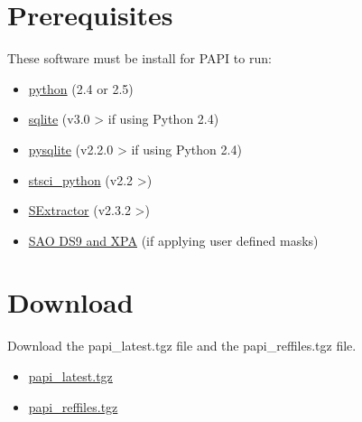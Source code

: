 \documentclass[letterpaper,10pt,english]{sphinxmanual}
\begin{document}

\section{Prerequisites}
\label{intro:prerequisites}\label{intro:index-0}
These software must be install for PAPI to run:
\begin{itemize}
\item {} 
\href{http://www.python.org}{python} (2.4 or 2.5)

\item {} 
\href{http://www.sqlite.org}{sqlite} (v3.0 \textgreater{} if using Python 2.4)

\item {} 
\href{http://initd.org/tracker/pysqlite}{pysqlite} (v2.2.0 \textgreater{} if using Python 2.4)

\item {} 
\href{http://www.stsci.edu/resources/software\_hardware/pyraf/stsci\_python}{stsci\_python} (v2.2 \textgreater{})

\item {} 
\href{http://astromatic.iap.fr/software/sextractor/}{SExtractor} (v2.3.2 \textgreater{})

\item {} 
\href{http://hea-www.harvard.edu/RD/ds9}{SAO DS9 and XPA} (if applying user defined masks)

\end{itemize}


\section{Download}
\label{intro:download}\label{intro:index-1}
Download the papi\_latest.tgz file and the papi\_reffiles.tgz file.
\begin{itemize}
\item {} 
\href{http://code.google.com/p/panicdrs/files/papi\_latests.tgz}{papi\_latest.tgz}

\item {} 
\href{http://code.google.com/p/panicdrs/files/papi\_reffiles.tgz}{papi\_reffiles.tgz}

\end{itemize}
\end{document}
